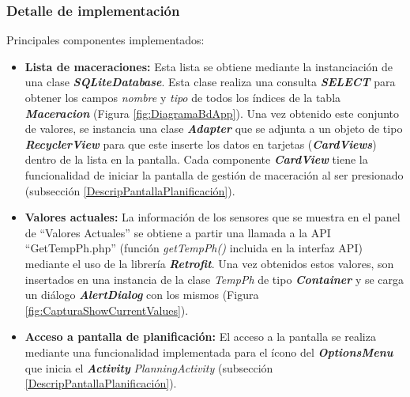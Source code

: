             \subsubsection{Detalle de implementación}
                Principales componentes implementados:
                \begin{itemize}
                    \item \textbf{Lista de maceraciones:} Esta lista se obtiene mediante la instanciación de una clase \textbf{\textit{\gls{SQLiteDatabase}}}. Esta clase realiza una consulta \textbf{\textit{\gls{SELECT}}} para obtener los campos \textit{nombre} y \textit{tipo} de todos los índices de la tabla \textbf{\textit{Maceracion}} (Figura \ref{fig:DiagramaBdApp}). Una vez obtenido este conjunto de valores, se instancia una clase \textbf{\textit{\gls{Adapter}}} que se adjunta a un objeto de tipo \textbf{\textit{\gls{RecyclerView}}} para que este inserte los datos en tarjetas (\textbf{\textit{\gls{CardView}s}}) dentro de la lista en la pantalla. Cada componente \textbf{\textit{\gls{CardView}}} tiene la funcionalidad de iniciar la pantalla de gestión de maceración al ser presionado (subsección \ref{DescripPantallaPlanificación}).
                 
                    \item \textbf{Valores actuales:} La información de los sensores que se muestra en el panel de ``Valores Actuales'' se obtiene a partir una llamada a la API ``GetTempPh.php'' (función \textit{getTempPh()} incluida en la interfaz API) mediante el uso de la librería \textbf{\textit{\gls{Retrofit}}}. Una vez obtenidos estos valores, son insertados en una instancia de la clase \textit{TempPh} de tipo \textbf{\textit{\gls{Container}}} y se carga un diálogo \textbf{\textit{\gls{AlertDialog}}} con los mismos (Figura \ref{fig:CapturaShowCurrentValues}).
                    
                    \item \textbf{Acceso a pantalla de planificación:} El acceso a la pantalla se realiza mediante una funcionalidad implementada para el ícono del \textbf{\textit{\gls{OptionsMenu}}} que inicia el \textbf{\textit{\gls{Activity}}} \textit{PlanningActivity} (subsección \ref{DescripPantallaPlanificación}).
                    
                \end{itemize}
                

